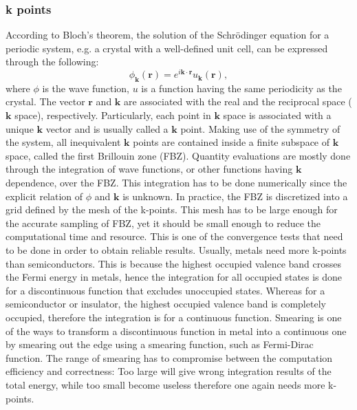 \subsubsection{k points}
According to Bloch's theorem, the solution of the Schr\"{o}dinger equation for a periodic system, e.g. a crystal with a well-defined unit cell, can be expressed through the following:
\begin{equation}\label{imp:bloch}
\phi_{\mathbf{k}}(\mathbf{r})=e^{i\mathbf{k}\cdot\mathbf{r}}u_{\mathbf{k}}(\mathbf{r}),
\end{equation}
where $\phi$ is the wave function, $u$ is a function having the same periodicity as the crystal. The vector $\mathbf{r}$ and $\mathbf{k}$ are associated with the real and the reciprocal space ($\mathbf{k}$ space), respectively. Particularly, each point in $\mathbf{k}$ space is associated with a unique $\mathbf{k}$ vector and is usually called a $\mathbf{k}$ point. Making use of the symmetry of the system, all inequivalent $\mathbf{k}$ points are contained inside a finite subspace of $\mathbf{k}$ space, called the first Brillouin zone (FBZ). Quantity evaluations are mostly done through the integration of wave functions, or other functions having $\mathbf{k}$ dependence, over the FBZ. This integration has to be done numerically since the explicit relation of $\phi$ and $\mathbf{k}$ is unknown. In practice, the FBZ is discretized into a grid defined by the mesh of the k-points. This mesh has to be large enough for the accurate sampling of FBZ, yet it should be small enough to reduce the computational time and resource. This is one of the convergence tests that need to be done in order to obtain reliable results. Usually, metals need more k-points than semiconductors. This is because the highest occupied valence band crosses the Fermi energy in metals, hence the integration for all occupied states is done for a discontinuous function that excludes unoccupied states.  Whereas for a semiconductor or insulator, the highest occupied valence band is completely occupied, therefore the integration is for a continuous function. Smearing is one of the ways to transform a discontinuous function in metal into a continuous one by smearing out the edge using a smearing function, such as Fermi-Dirac function. The range of smearing has to compromise between the computation efficiency and correctness: Too large will give wrong integration results of the total energy, while too small become useless therefore one again needs more k-points.
